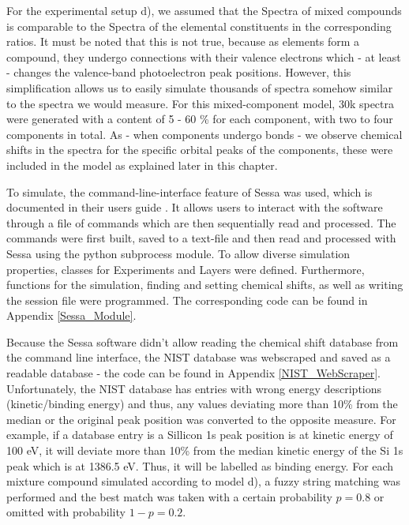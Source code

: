 For the experimental setup d), we assumed that the Spectra of mixed compounds is comparable to the Spectra of the elemental constituents in the corresponding ratios. It must be noted that this is not true, because as elements form a compound, they undergo connections with their valence electrons which - at least - changes the valence-band photoelectron peak positions. However, this simplification allows us to easily simulate thousands of spectra somehow similar to the spectra we would measure. For this mixed-component model, 30k spectra were generated with a content of 5 - 60 \% for each component, with two to four components in total. As - when components undergo bonds - we observe chemical shifts in the spectra for the specific orbital peaks of the components, these were included in the model as explained later in this chapter.
 
To simulate, the command-line-interface feature of Sessa was used, which is documented in their users guide \cite{werner_simulation_2021}. It allows users to interact with the software through a file of commands which are then sequentially read and processed. The commands were first built, saved to a text-file and then read and processed with Sessa using the python subprocess module. To allow diverse simulation properties, classes for Experiments and Layers were defined. Furthermore, functions for the simulation, finding and setting chemical shifts, as well as writing the session file were programmed. The corresponding code can be found in Appendix \ref{Sessa_Module}.

Because the Sessa software didn't allow reading the chemical shift database from the command line interface, the NIST database was webscraped and saved as a readable database - the code can be found in Appendix \ref{NIST_WebScraper}. Unfortunately, the NIST database has entries with wrong energy descriptions (kinetic/binding energy) and thus, any values deviating more than 10\% from the median or the original peak position was converted to the opposite measure. For example, if a database entry is a Sillicon 1s peak position is at kinetic energy of 100 eV, it will deviate more than 10\% from the median kinetic energy of the Si 1s peak which is at 1386.5 eV. Thus, it will be labelled as binding energy. 
For each mixture compound simulated according to model d), a fuzzy string matching was performed and the best match was taken with a certain probability $p=0.8$ or omitted with probability $1-p = 0.2$.



